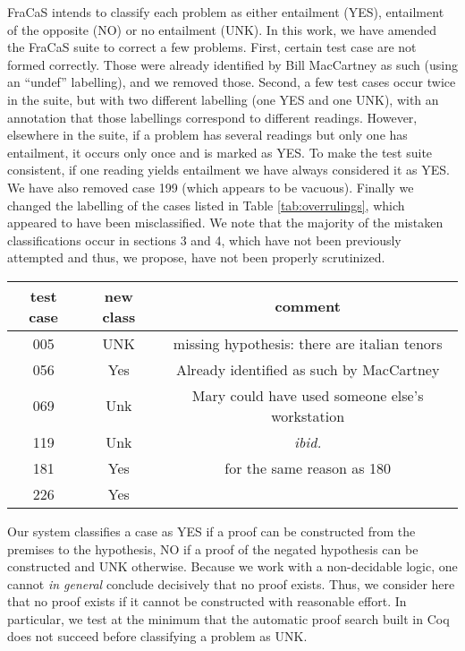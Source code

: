 \documentclass[11pt]{article}
\begin{document}
FraCaS intends to classify each problem as either entailment (YES),
entailment of the opposite (NO) or no entailment (UNK).  In this work,
we have amended the FraCaS suite to correct a few problems. First,
certain test case are not formed correctly. Those were already
identified by Bill MacCartney as such (using an ``undef''
labelling), and we removed those. Second, a few test cases occur twice
in the suite, but with two different labelling (one YES and one UNK),
with an annotation that those labellings correspond to different
readings. However, elsewhere in the suite, if a problem has several
readings but only one has entailment, it occurs only once and is
marked as YES. To make the test suite consistent, if one reading
yields entailment we have always considered it as YES. We have also
removed case 199 (which appears to be vacuous). Finally we changed the
labelling of the cases listed in Table \ref{tab:overrulings}, which appeared to have been
misclassified. We note that the majority of the mistaken
classifications occur in sections 3 and 4, which have not been
previously attempted and thus, we propose, have not been properly
scrutinized.
\begin{table*}
  \centering
\begin{tabular}{ccc}
 test case & new class & comment \\ \hline
    005 & UNK & missing hypothesis: there are italian tenors \\
   056 &  Yes & Already identified as such by MacCartney \\
  069 & Unk & Mary could have used someone else's workstation \\
  119 & Unk & \textit{ibid.} \\
  181 & Yes & for the same reason as 180 \\
  226 & Yes &
\end{tabular}
  \caption{Overruled FraCaS cases}
  \label{tab:overrulings}
\end{table*}

Our system classifies a case as YES if a proof can be constructed from
the premises to the hypothesis, NO if a proof of the negated
hypothesis can be constructed and UNK otherwise. Because we work with
a non-decidable logic, one cannot \emph{in general} conclude
decisively that no proof exists. Thus, we consider here that no proof
exists if it cannot be constructed with reasonable effort. In
particular, we test at the minimum that the automatic proof search
built in Coq does not succeed before classifying a problem as UNK.
\end{document}
